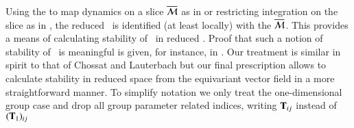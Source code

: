 


Using the {\mframes} to map dynamics on a slice $\overline{\cal M}$
as in  or restricting
integration on the slice as in ,
the reduced \statesp\ is
identified (at least locally) with the {\slice}
${\overline{\cal M}}$. This provides a means of calculating stability
of \reqva\ in reduced \statesp. Proof that such a notion of stability
of \reqva\ is meaningful is given, for instance, in .
Our treatment is similar in spirit 
to that of Chossat and Lauterbach but our final 
prescription allows to calculate stability in reduced space
from the equivariant vector field in a more straightforward manner.
To simplify notation we only treat the one-dimensional group case 
and drop all group parameter related indices, writing $\mathbf{T}_{ij}$ instead of
$(\mathbf{T}_1)_{ij}$ \etc

